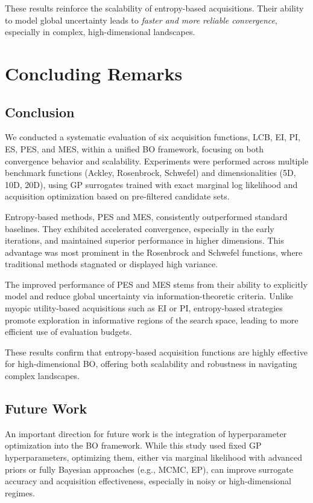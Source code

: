 \documentclass{ut-thesis}
\begin{document}
These results reinforce the scalability of entropy-based acquisitions. Their ability to model global uncertainty leads to \textit{faster and more reliable convergence}, especially in complex, high-dimensional landscapes.

\chapter{Concluding Remarks}

\section{Conclusion}
We conducted a systematic evaluation of six acquisition functions, LCB, EI, PI, ES, PES, and MES, within a unified BO framework, focusing on both convergence behavior and scalability. Experiments were performed across multiple benchmark functions (Ackley, Rosenbrock, Schwefel) and dimensionalities (5D, 10D, 20D), using GP surrogates trained with exact marginal log likelihood and acquisition optimization based on pre-filtered candidate sets.

Entropy-based methods, PES and MES, consistently outperformed standard baselines. They exhibited accelerated convergence, especially in the early iterations, and maintained superior performance in higher dimensions. This advantage was most prominent in the Rosenbrock and Schwefel functions, where traditional methods stagnated or displayed high variance.

The improved performance of PES and MES stems from their ability to explicitly model and reduce global uncertainty via information-theoretic criteria. Unlike myopic utility-based acquisitions such as EI or PI, entropy-based strategies promote exploration in informative regions of the search space, leading to more efficient use of evaluation budgets.

These results confirm that entropy-based acquisition functions are highly effective for high-dimensional BO, offering both scalability and robustness in navigating complex landscapes.

\section{Future Work}
An important direction for future work is the integration of hyperparameter optimization into the BO framework. While this study used fixed GP hyperparameters, optimizing them, either via marginal likelihood with advanced priors or fully Bayesian approaches (e.g., MCMC, EP), can improve surrogate accuracy and acquisition effectiveness, especially in noisy or high-dimensional regimes.
\end{document}
